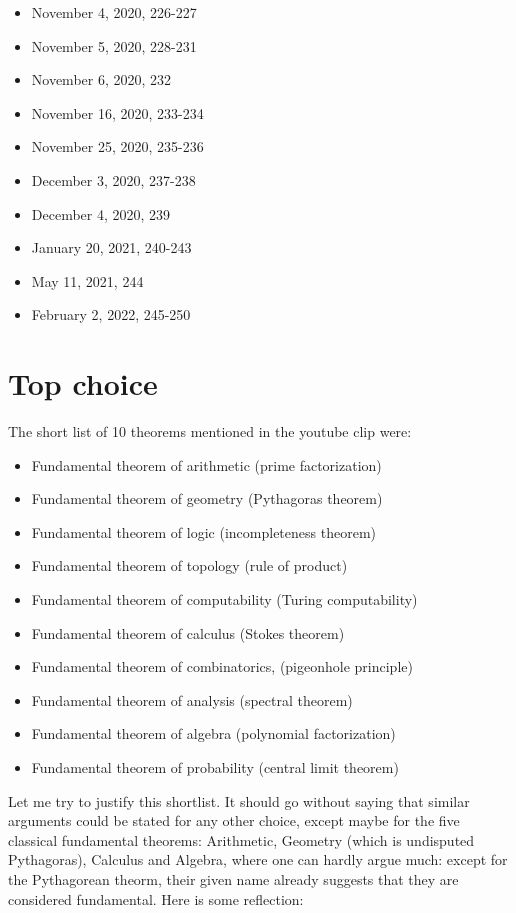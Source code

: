 \documentclass[12pt]{amsart}
\begin{document}
\begin{tiny}
\begin{itemize}
\item November 4, 2020, 226-227
\item November 5, 2020, 228-231
\item November 6, 2020, 232
\item November 16, 2020, 233-234
\item November 25, 2020, 235-236
\item December 3, 2020, 237-238
\item December 4, 2020, 239
\item January 20, 2021, 240-243
\item May 11, 2021, 244
\item February 2, 2022, 245-250
\end{itemize}
\end{tiny}

\section{Top choice}

The short list of 10 theorems mentioned in the youtube clip were:

\begin{itemize}
\item Fundamental theorem of arithmetic (prime factorization)
\item Fundamental theorem of geometry (Pythagoras theorem)
\item Fundamental theorem of logic (incompleteness theorem)
\item Fundamental theorem of topology (rule of product)
\item Fundamental theorem of computability (Turing computability)
\item Fundamental theorem of calculus (Stokes theorem)
\item Fundamental theorem of combinatorics, (pigeonhole principle)
\item Fundamental theorem of analysis (spectral theorem)
\item Fundamental theorem of algebra (polynomial factorization)
\item Fundamental theorem of probability (central limit theorem)
\end{itemize}

Let me try to justify this shortlist. It should go without saying that similar arguments could 
be stated for any other choice, except maybe for the
five classical fundamental theorems: Arithmetic, Geometry (which is undisputed Pythagoras), 
Calculus and Algebra, where one can hardly argue much: except for the Pythagorean theorm,
their given name already suggests that they are considered fundamental. Here is some reflection:
\end{document}
